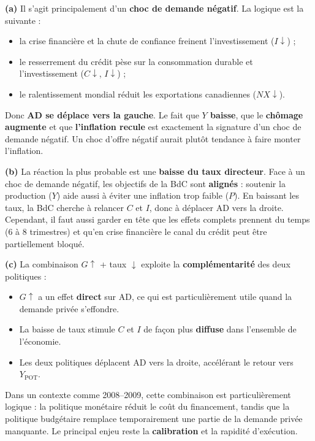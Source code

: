 \begin{reponse}
\textbf{(a)} Il s'agit principalement d'un \textbf{choc de demande négatif}. La logique est la suivante :
\begin{itemize}
   \item la crise financière et la chute de confiance freinent l'investissement ($I \downarrow$) ;
   \item le resserrement du crédit pèse sur la consommation durable et l'investissement ($C \downarrow$, $I \downarrow$) ;
   \item le ralentissement mondial réduit les exportations canadiennes ($NX \downarrow$).
\end{itemize}
Donc \textbf{AD se déplace vers la gauche}. Le fait que \textbf{$Y$ baisse}, que le \textbf{chômage augmente} et que \textbf{l'inflation recule} est exactement la signature d'un choc de demande négatif. Un choc d'offre négatif aurait plutôt tendance à faire monter l'inflation.

\textbf{(b)} La réaction la plus probable est une \textbf{baisse du taux directeur}. Face à un choc de demande négatif, les objectifs de la BdC sont \textbf{alignés} : soutenir la production ($Y$) aide aussi à éviter une inflation trop faible ($P$). En baissant les taux, la BdC cherche à relancer $C$ et $I$, donc à déplacer AD vers la droite. Cependant, il faut aussi garder en tête que les effets complets prennent du temps (6 à 8 trimestres) et qu'en crise financière le canal du crédit peut être partiellement bloqué.

\textbf{(c)} La combinaison $G \uparrow$ + taux $\downarrow$ exploite la \textbf{complémentarité} des deux politiques :
\begin{itemize}
   \item $G \uparrow$ a un effet \textbf{direct} sur AD, ce qui est particulièrement utile quand la demande privée s'effondre.
   \item La baisse de taux stimule $C$ et $I$ de façon plus \textbf{diffuse} dans l'ensemble de l'économie.
   \item Les deux politiques déplacent AD vers la droite, accélérant le retour vers $Y_{\text{POT}}$.
\end{itemize}
Dans un contexte comme 2008--2009, cette combinaison est particulièrement logique : la politique monétaire réduit le coût du financement, tandis que la politique budgétaire remplace temporairement une partie de la demande privée manquante. Le principal enjeu reste la \textbf{calibration} et la rapidité d'exécution.


\end{reponse}
